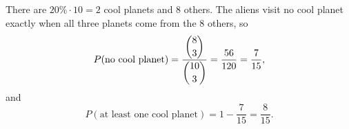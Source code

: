 There are $20\%\cdot10=2$ cool planets and $8$ others. The aliens visit no cool planet exactly when all three planets come from the $8$ others, so
\[P(\text{no cool planet})=\dfrac{\dbinom83}{\dbinom{10}3}=\dfrac{56}{120}=\dfrac{7}{15},\]
and
\[P(\text{at least one cool planet})=1-\dfrac{7}{15}=\boxed{\dfrac{8}{15}}.\]
